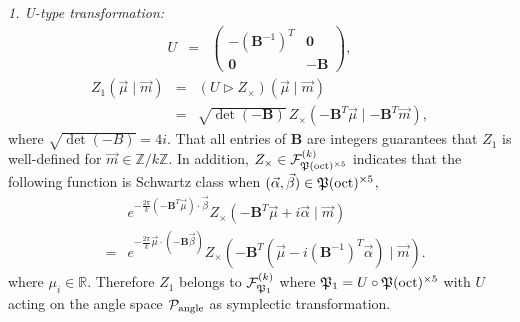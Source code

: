 \documentclass[aps,prd,notitlepage,nofootinbib,superscriptaddress,groupedaddress,twocolumn]{revtex4-1}
\def\R{\mathbb{R}}
\def\be{\begin{eqnarray}}
\def\ee{\end{eqnarray}}
\newcommand{\cf}{\mathcal F}
\newcommand{\calp}{\mathcal P}
\renewcommand{\a}{\alpha}
\renewcommand{\b}{\beta}
\newcommand{\lt}{\left}
\newcommand{\rt}{\right}
\newcommand{\act}{\rhd}
\begin{document}
\emph{1. U-type transformation:}
\be
U&=&\left(\begin{array}{cc}
-\left(\mathbf{B}^{-1}\right)^{T} & \mathbf{0} \\
\mathbf{0} & -\mathbf{B}
\end{array}\right),
\ee
\be
Z_1(\vec{\mu}\mid \vec{m})&=& (U\act Z_{\times})(\vec{\mu}\mid \vec{m})\nonumber\\
&=&\sqrt{\det( -\mathbf{B})}\,Z_{\times}\lt(-\mathbf{B}^T\vec{\mu}\mid-\mathbf{B}^T\vec{m}\rt),\label{Utrans}
\ee
where $\sqrt{\det( -B)}=4 i $. That all entries of $\mathbf{B}$ are integers guarantees that $Z_1$ is well-defined for $\vec{m}\in\mathbb{Z}/k\mathbb{Z}$. In addition, $Z_\times \in \cf^{(k)}_{\Fp(\mathrm{oct})^{\times 5}}$ indicates that the following function is Schwartz class when $(\vec{\a},\vec{\b})\in\Fp(\mathrm{oct})^{\times 5} $, 
\be
&&e^{-\frac{2\pi}{k}(-\mathbf{B}^T\vec{\mu})\cdot \vec{\b}}Z_{\times}\lt(-\mathbf{B}^T\vec{\mu}+i\vec{\a}\mid \vec{m}\rt)\nonumber\\
&=&e^{-\frac{2\pi}{k}\vec{\mu}\cdot (-\mathbf{B}\vec{\b})}Z_{\times}\lt(-\mathbf{B}^T(\vec{\mu}-i(\mathbf{B}^{-1})^T\vec{\a})\mid \vec{m}\rt).
\ee
where $\mu_i\in\R$. Therefore $Z_1$ belongs to $\cf_{\Fp_1}^{(k)}$ where $\mathfrak{P}_1=U\circ \mathfrak{P}(\mathrm{oct})^{\times 5} $ with $U$ acting on the angle space $\calp_{\rm angle}$ as symplectic transformation. \\
\end{document}
